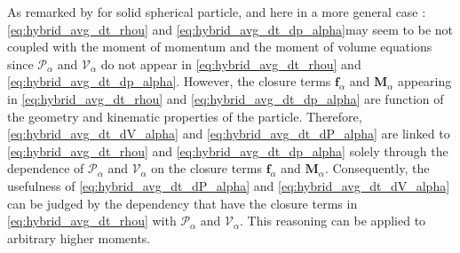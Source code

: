As remarked by \citet{jackson1997locally} for solid spherical particle, and here in a more general case :\ref{eq:hybrid_avg_dt_rhou} and \ref{eq:hybrid_avg_dt_dp_alpha}may seem to be not coupled with the moment of momentum and the moment of volume equations since $\mathcal{P}_\alpha$ and $\mathcal{V}_\alpha$ do not appear in \ref{eq:hybrid_avg_dt_rhou} and \ref{eq:hybrid_avg_dt_dp_alpha}.
However, the closure terms $\textbf{f}_\alpha$ and $\textbf{M}_\alpha$ appearing in \ref{eq:hybrid_avg_dt_rhou} and \ref{eq:hybrid_avg_dt_dp_alpha} are function of the geometry and kinematic properties of the particle. 
Therefore,  \ref{eq:hybrid_avg_dt_dV_alpha} and \ref{eq:hybrid_avg_dt_dP_alpha} are linked to \ref{eq:hybrid_avg_dt_rhou} and \ref{eq:hybrid_avg_dt_dp_alpha} solely through the dependence of $\mathcal{P}_\alpha$ and $\mathcal{V}_\alpha$ on the closure terms  $\textbf{f}_\alpha$ and $\textbf{M}_\alpha$. 
Consequently, the usefulness of \ref{eq:hybrid_avg_dt_dP_alpha} and \ref{eq:hybrid_avg_dt_dV_alpha} can be judged by the dependency that have the closure terms in \ref{eq:hybrid_avg_dt_rhou} with $\mathcal{P}_\alpha$ and $\mathcal{V}_\alpha$. 
This reasoning can be applied to arbitrary higher moments. 
